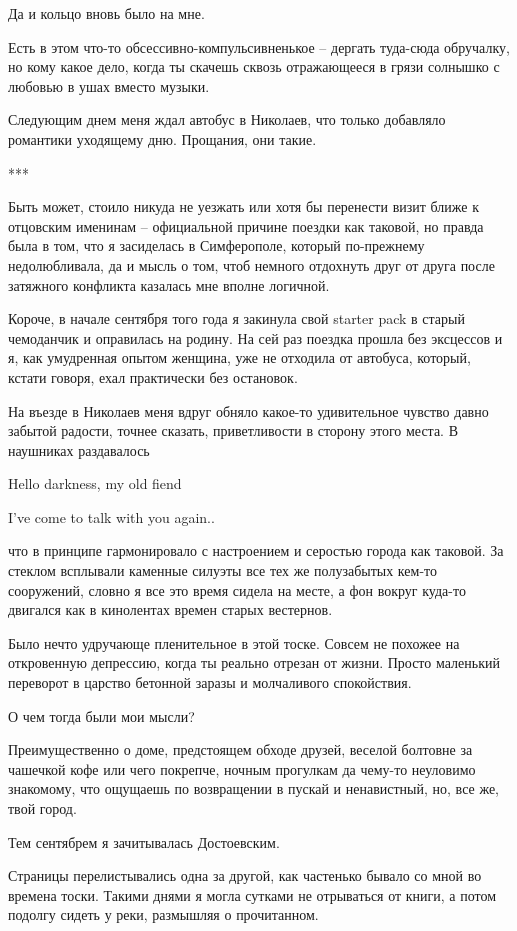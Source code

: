 \documentclass[
]{book}
\begin{document}
Да и кольцо вновь было на мне.

Есть в этом что-то обсессивно-компульсивненькое -- дергать туда-сюда обручалку, но кому какое дело, когда ты скачешь сквозь отражающееся в грязи солнышко с любовью в ушах вместо музыки.

Следующим днем меня ждал автобус в Николаев, что только добавляло романтики уходящему дню. Прощания, они такие.

***

Быть может, стоило никуда не уезжать или хотя бы перенести визит ближе к отцовским именинам -- официальной причине поездки как таковой, но правда была в том, что я засиделась в Симферополе, который по-прежнему недолюбливала, да и мысль о том, чтоб немного отдохнуть друг от друга после затяжного конфликта казалась мне вполне логичной.

Короче, в начале сентября того года я закинула свой starter pack в старый чемоданчик и оправилась на родину. На сей раз поездка прошла без эксцессов и я, как умудренная опытом женщина, уже не отходила от автобуса, который, кстати говоря, ехал практически без остановок.

На въезде в Николаев меня вдруг обняло какое-то удивительное чувство давно забытой радости, точнее сказать, приветливости в сторону этого места. В наушниках раздавалось

Hello darkness, my old fiend

I've come to talk with you again..

что в принципе гармонировало с настроением и серостью города как таковой. За стеклом всплывали каменные силуэты все тех же полузабытых кем-то сооружений, словно я все это время сидела на месте, а фон вокруг куда-то двигался как в кинолентах времен старых вестернов.

Было нечто удручающе пленительное в этой тоске. Совсем не похожее на откровенную депрессию, когда ты реально отрезан от жизни. Просто маленький переворот в царство бетонной заразы и молчаливого спокойствия.

О чем тогда были мои мысли?

Преимущественно о доме, предстоящем обходе друзей, веселой болтовне за чашечкой кофе или чего покрепче, ночным прогулкам да чему-то неуловимо знакомому, что ощущаешь по возвращении в пускай и ненавистный, но, все же, твой город.

Тем сентябрем я зачитывалась Достоевским.

Страницы перелистывались одна за другой, как частенько бывало со мной во времена тоски. Такими днями я могла сутками не отрываться от книги, а потом подолгу сидеть у реки, размышляя о прочитанном.
\end{document}
